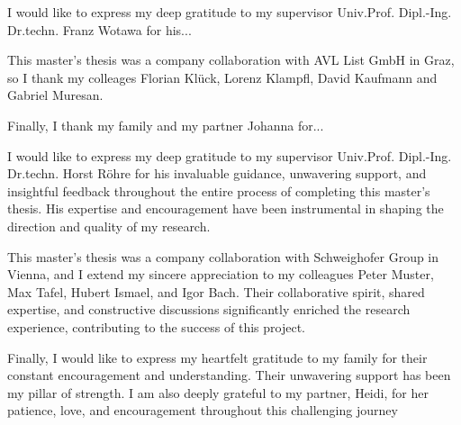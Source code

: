 I would like to express my deep gratitude to my supervisor Univ.Prof. Dipl.-Ing. Dr.techn. Franz Wotawa for his...

This master's thesis was a company collaboration with AVL List GmbH in Graz, so I thank my colleages Florian Klück, Lorenz Klampfl, David Kaufmann and Gabriel Muresan.

Finally, I thank my family and my partner Johanna for...




I would like to express my deep gratitude to my supervisor Univ.Prof. Dipl.-Ing. Dr.techn. Horst Röhre for his invaluable guidance, unwavering support, and insightful feedback throughout the entire process of completing this master's thesis. His expertise and encouragement have been instrumental in shaping the direction and quality of my research.

This master's thesis was a company collaboration with Schweighofer Group in Vienna, and I extend my sincere appreciation to my colleagues Peter Muster, Max Tafel, Hubert Ismael, and Igor Bach. Their collaborative spirit, shared expertise, and constructive discussions significantly enriched the research experience, contributing to the success of this project.

Finally, I would like to express my heartfelt gratitude to my family for their constant encouragement and understanding. Their unwavering support has been my pillar of strength. I am also deeply grateful to my partner, Heidi, for her patience, love, and encouragement throughout this challenging journey


